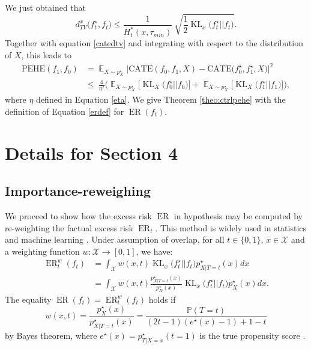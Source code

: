 \documentclass[12pt]{article}
\theoremstyle{plain}
\theoremstyle{definition}
\theoremstyle{remark}
\DeclareMathOperator{\E}{\mathbb{E}}
\DeclareMathOperator{\KL}{\text{KL}}
\DeclareMathOperator{\ER}{\text{ER}}
\begin{document}
We just obtained that
\begin{equation}
    d_{TV}^x \Big( f^{\star}_{t} ,f_{t}\Big)  \leq \frac{1}{ \overline{H}^{\star}_{t}( x,\tau _{min})  } \ \sqrt{\frac{1}{2}  \KL_x \Big( f^{\star}_{t} ||f_{t}\Big) }.
\end{equation}
Together with equation \ref{catedtv} and integrating with respect to the distribution of $X$, this leads to
\begin{align*}
    \text{PEHE}(f_1,f_0) &=\E_{X\sim p^\star_{X}} \Big|\text{CATE}( f_{0} ,f_{1} ,X) -\text{CATE}\Big( f^{\star}_{0} ,f^{\star}_{1} , X\Big) \Big|^2 \\&\leq \ \frac{4}{\eta^2 } \Big(\E_{X\sim p^\star_{X}}\Big[\KL_X\Big( f^{\star}_{0} ||f_{0}\Big)\Big] +\E_{X\sim p^\star_{X}}\Big[\KL_X \Big( f^{\star}_{1} ||f_{1}\Big)\Big] \Big),
\end{align*}
where $\eta$ defined in Equation \ref{eta}. We give Theorem \ref{theo:ctrlpehe} with the definition of Equation \eqref{erdef} for $\ER(f_t)$.







\section{Details for Section 4}
\subsection{Importance-reweighing}\label{app:section4}

We proceed to show how the excess risk $\ER$ in hypothesis may be computed by re-weighting the factual excess risk $\ER_t$. This method is widely used in statistics and machine learning \cite{Shimodaira2000ImprovingFunction,Cortes2010LearningWeighting,ROSENBAUM}. Under assumption of overlap, for all $ t\in \{0,1\}$, $x \in \mathcal X$ and a weighting function $ w : \mathcal{X}  \to [ 0,1]$, we have: 
\begin{align}
    \ER^{w}_{t}( f_{t}) &=\int _{\mathcal{X}} w(x,t) \KL_{x}\Big( f^{\star}_t ||f_t\Big) p^\star_{X | T=t}(x)  dx\\
    &=\int _{\mathcal{X}} w(x,t)\frac{p^\star_{X | T=t}(x)}{p^\star_{X }(x)} \KL_{x}\Big( f^{\star}_t ||f_t\Big) p^\star_{X }(x) dx.
\end{align}
The equality $ \ER( f_{t})=  \ER^{w}_{t}( f_{t})$ holds if
\begin{equation}
w(x, t)=\frac{p^\star_{X}(x)}{p^\star_{X | T=t}(x) }= 
\frac{\mathbb P(T=t)}{(2t-1)(e^{\star}(x)-1) +1-t}
\end{equation}
by Bayes theorem, where $e^{\star}(x)=p^{\star}_{T | X=x}(t=1)$ is the true propensity score \cite{ROSENBAUM}.
\end{document}
